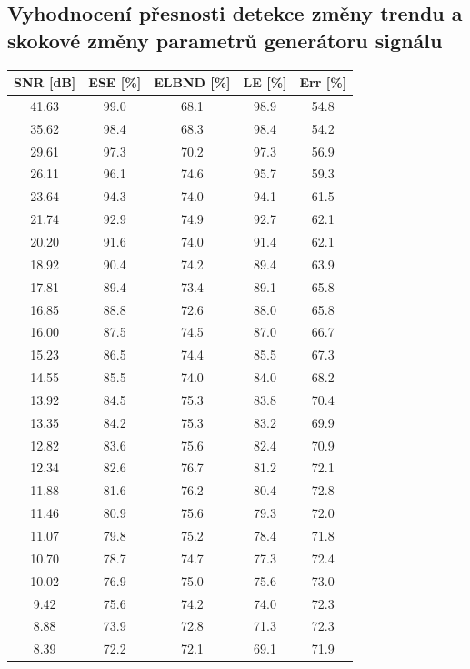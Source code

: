 \documentclass[11pt,twoside,openright]{report}
\begin{document}
\begin{appendices}
\section{Vyhodnocení přesnosti detekce změny trendu a \\ skokové změny parametrů generátoru signálu}\label{priloha:tab}
\begin{table}[!h]
\begin{center}
\begin{tabular}{|c|c|c|c|c|}
\hline
\textbf{SNR [dB]} & \textbf{ESE [\%]} & \textbf{ELBND [\%]} & \textbf{LE [\%]} & \textbf{Err [\%]} \\ 
\hline
41.63 & 99.0 & 68.1 & 98.9 & 54.8 \\ 
35.62 & 98.4 & 68.3 & 98.4 & 54.2 \\ 
29.61 & 97.3 & 70.2 & 97.3 & 56.9 \\ 
26.11 & 96.1 & 74.6 & 95.7 & 59.3 \\ 
23.64 & 94.3 & 74.0 & 94.1 & 61.5 \\ 
21.74 & 92.9 & 74.9 & 92.7 & 62.1 \\ 
20.20 & 91.6 & 74.0 & 91.4 & 62.1 \\ 
18.92 & 90.4 & 74.2 & 89.4 & 63.9 \\ 
17.81 & 89.4 & 73.4 & 89.1 & 65.8 \\ 
16.85 & 88.8 & 72.6 & 88.0 & 65.8 \\ 
16.00 & 87.5 & 74.5 & 87.0 & 66.7 \\ 
15.23 & 86.5 & 74.4 & 85.5 & 67.3 \\ 
14.55 & 85.5 & 74.0 & 84.0 & 68.2 \\ 
13.92 & 84.5 & 75.3 & 83.8 & 70.4 \\ 
13.35 & 84.2 & 75.3 & 83.2 & 69.9 \\ 
12.82 & 83.6 & 75.6 & 82.4 & 70.9 \\ 
12.34 & 82.6 & 76.7 & 81.2 & 72.1 \\ 
11.88 & 81.6 & 76.2 & 80.4 & 72.8 \\ 
11.46 & 80.9 & 75.6 & 79.3 & 72.0 \\ 
11.07 & 79.8 & 75.2 & 78.4 & 71.8 \\ 
10.70 & 78.7 & 74.7 & 77.3 & 72.4 \\ 
10.02 & 76.9 & 75.0 & 75.6 & 73.0 \\ 
9.42 & 75.6 & 74.2 & 74.0 & 72.3 \\ 
8.88 & 73.9 & 72.8 & 71.3 & 72.3 \\ 
8.39 & 72.2 & 72.1 & 69.1 & 71.9 \\ 

\end{tabular}
\end{center}
\end{table}
\end{appendices}
\end{document}
